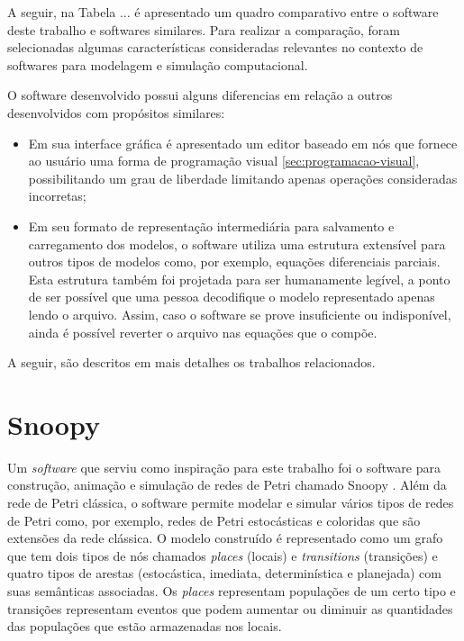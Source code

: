 \documentclass[
	12pt,				%
	openright,			%
	oneside,			%
	a4paper,			%
	main=brazil,
	english,			%
	]{ufsj-abntex2}
\begin{document}
A seguir, na Tabela ... é apresentado um quadro comparativo entre o software deste trabalho e softwares similares. Para realizar a comparação, foram selecionadas algumas características consideradas relevantes no contexto de softwares para modelagem e simulação computacional. 


O software desenvolvido possui alguns diferencias em relação a outros desenvolvidos com propósitos similares:

\begin{itemize}
    \item Em sua interface gráfica é apresentado um editor baseado em nós que fornece ao usuário uma forma de programação visual \ref{sec:programacao-visual}, possibilitando um grau de liberdade limitando apenas operações consideradas incorretas;
    
    \item Em seu formato de representação intermediária para salvamento e carregamento dos modelos, o software utiliza uma estrutura extensível para outros tipos de modelos como, por exemplo, equações diferenciais parciais. Esta estrutura também foi projetada para ser humanamente legível, a ponto de ser possível que uma pessoa decodifique o modelo representado apenas lendo o arquivo. Assim, caso o software se prove insuficiente ou indisponível, ainda é possível reverter o arquivo nas equações que o compõe. %
\end{itemize}

A seguir, são descritos em mais detalhes os trabalhos relacionados. 

\section{Snoopy}

Um \textit{software} que serviu como inspiração para este trabalho foi o software para construção, animação e simulação de redes de Petri chamado Snoopy \cite{Heiner2008,Heiner2012,Liu2012}. Além da rede de Petri clássica, o software permite modelar e simular vários tipos de redes de Petri como, por exemplo, redes de Petri estocásticas e coloridas que são extensões da rede clássica. O modelo construído é representado como um grafo que tem dois tipos de nós chamados \textit{places} (locais) e \textit{transitions} (transições) e quatro tipos de arestas (estocástica, imediata, determinística e planejada) com suas semânticas associadas. Os \textit{places} representam populações de um certo tipo e transições representam eventos que podem aumentar ou diminuir as quantidades das populações que estão armazenadas nos locais. 
\end{document}
